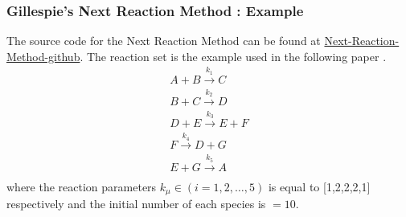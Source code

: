\documentclass[11pt,a4paper]{article}
\begin{document}
\subsubsection{Gillespie's Next Reaction Method : Example}
The source code for the Next Reaction Method can be found at \href{https://github.com/Prateeba/TRAN-F501-Internship-201819/tree/master/Code/G_next_reaction}{Next-Reaction-Method-github}. The reaction set is the example used in the following paper \cite{gibson_efficient_2000}.
\begin{gather}
  {A + B \xrightarrow{k_{1}} C}      \\
  {B + C \xrightarrow{k_{2}} D}      \\
  {D + E \xrightarrow{k_{3}} E + F}     \\
  {F \xrightarrow{k_{4}} D + G}     \\
  {E + G \xrightarrow{k_{5}} A} \\
\end{gather}
where the reaction parameters $k_{\mu} \in (i = 1, 2, \dots, 5)$ is equal to [1,2,2,2,1] respectively and the initial number of each species is $= 10$.
\end{document}
